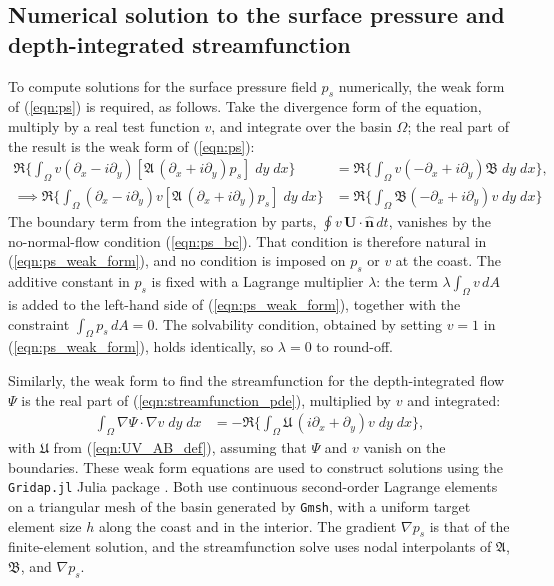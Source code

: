 \documentclass{ametsocV6.2}
\begin{document}
\appendix[C]

\subsection{Numerical solution to the surface pressure and depth-integrated streamfunction}

To compute solutions for the surface pressure field $p_s$ numerically, the weak form of (\ref{eqn:ps}) is required, as follows.
Take the divergence form of the equation, multiply by a real test function $v$, and integrate over the basin $\Omega$; the real part of the result is the weak form of (\ref{eqn:ps}):
 \begin{align}
 \Re \Big\{ \int_\Omega v
\left(
\partial_x - i \partial_y
\right)
\left[
\mathfrak{A} \,\left( \partial_x + i \partial_y \right) p_s
\right]
 \; dy\; dx \Big\}
 & = \Re \Big\{ \int_\Omega v \left(
- \partial_x + i \partial_y
\right) \mathfrak{B}
 \; dy\; dx \Big\} , \nonumber \\
 \implies
  \Re \Big\{ \int_\Omega 
\left(
\partial_x - i \partial_y
\right) v
\left[
\mathfrak{A} \,\left( \partial_x + i \partial_y \right) p_s
\right]
 \; dy\; dx \Big\}
 & = \Re \Big\{ \int_\Omega \mathfrak{B}\left(
- \partial_x + i \partial_y
\right) v
 \; dy\; dx \Big\}
 \label{eqn:ps_weak_form}
\end{align}
The boundary term from the integration by parts, $\oint v \, \mathbf{U} \cdot \hat{\mathbf{n}} \, dt$, vanishes by the no-normal-flow condition (\ref{eqn:ps_bc}).
That condition is therefore natural in (\ref{eqn:ps_weak_form}), and no condition is imposed on $p_s$ or $v$ at the coast.
The additive constant in $p_s$ is fixed with a Lagrange multiplier $\lambda$: the term $\lambda \int_\Omega v \, dA$ is added to the left-hand side of (\ref{eqn:ps_weak_form}), together with the constraint $\int_\Omega p_s \, dA = 0$.
The solvability condition, obtained by setting $v = 1$ in (\ref{eqn:ps_weak_form}), holds identically, so $\lambda = 0$ to round-off.

Similarly, the weak form to find the streamfunction for the depth-integrated flow $\Psi$ is the real part of (\ref{eqn:streamfunction_pde}), multiplied by $v$ and integrated:
\begin{align}
 \int_\Omega \nabla \Psi  \cdot \nabla v \; dy \; dx
 & = - \Re \Big\{ \int_\Omega \mathfrak{U} \, (i\partial_x + \partial_y)v \; d y \; dx \Big\} , \nonumber
\end{align}
with $\mathfrak{U}$ from (\ref{eqn:UV_AB_def}),
assuming that $\Psi$ and $v$ vanish on the boundaries.
These weak form equations are used to construct solutions using the \texttt{Gridap.jl} Julia package \citep{badia&verdugo20}. Both use continuous second-order Lagrange elements on a triangular mesh of the basin generated by \texttt{Gmsh}, with a uniform target element size $h$ along the coast and in the interior. The gradient $\nabla p_s$ is that of the finite-element solution, and the streamfunction solve uses nodal interpolants of $\mathfrak{A}$, $\mathfrak{B}$, and $\nabla p_s$.
\end{document}
